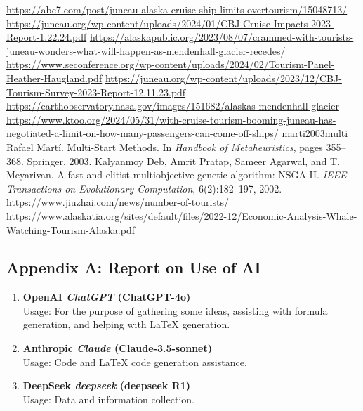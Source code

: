 \documentclass[12pt]{article}  %
\begin{document}
\clearpage


\begin{thebibliography}{99}
 \url{https://abc7.com/post/juneau-alaska-cruise-ship-limits-overtourism/15048713/}
 \url{https://juneau.org/wp-content/uploads/2024/01/CBJ-Cruise-Impacts-2023-Report-1.22.24.pdf}
 \url{https://alaskapublic.org/2023/08/07/crammed-with-tourists-juneau-wonders-what-will-happen-as-mendenhall-glacier-recedes/}
 \url{https://www.seconference.org/wp-content/uploads/2024/02/Tourism-Panel-Heather-Haugland.pdf}
 \url{https://juneau.org/wp-content/uploads/2023/12/CBJ-Tourism-Survey-2023-Report-12.11.23.pdf}
 \url{https://earthobservatory.nasa.gov/images/151682/alaskas-mendenhall-glacier}
 \url{https://www.ktoo.org/2024/05/31/with-cruise-tourism-booming-juneau-has-negotiated-a-limit-on-how-many-passengers-can-come-off-ships/}
 {marti2003multi} Rafael Martí. \newblock Multi-Start Methods. \newblock In \emph{Handbook of Metaheuristics}, pages 355--368. Springer, 2003.
 Kalyanmoy Deb, Amrit Pratap, Sameer Agarwal, and T. Meyarivan. \newblock A fast and elitist multiobjective genetic algorithm: NSGA-II. \newblock \emph{IEEE Transactions on Evolutionary Computation}, 6(2):182--197, 2002.
 \url{https://www.jiuzhai.com/news/number-of-tourists/}
 \url{https://www.alaskatia.org/sites/default/files/2022-12/Economic-Analysis-Whale-Watching-Tourism-Alaska.pdf}
\end{thebibliography}


\begin{subappendices}  %

\section{Appendix A: Report on Use of AI}
\begin{enumerate}
	\item \textbf{OpenAI \textit{ChatGPT} (ChatGPT-4o)}\\
	Usage: For the purpose of gathering some ideas, assisting with formula generation, and helping with LaTeX generation.
	
	\item \textbf{Anthropic \textit{Claude} (Claude-3.5-sonnet)}\\
	Usage: Code and LaTeX code generation assistance.
	
	\item \textbf{DeepSeek \textit{deepseek} (deepseek R1)}\\
	Usage: Data and information collection.
\end{enumerate}
\end{subappendices}  %
\end{document}

